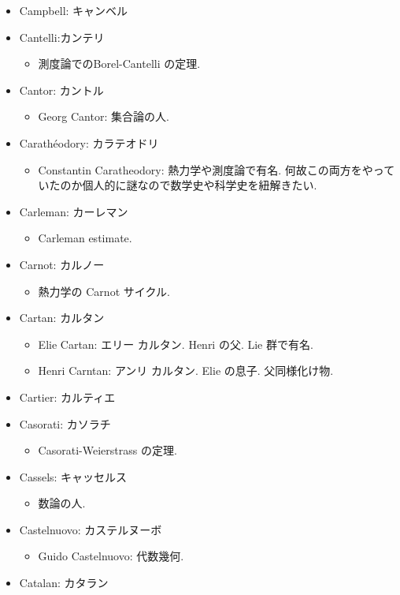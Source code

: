 \documentclass[openany, a4paper, oneside]{jsbook}
\begin{document}
\begin{itemize}
\item Campbell: キャンベル
\item Cantelli:カンテリ
\begin{itemize}
\item 測度論でのBorel-Cantelli の定理.
\end{itemize}
\item Cantor: カントル
\begin{itemize}
\item Georg Cantor: 集合論の人.
\end{itemize}
\item Carath\'eodory: カラテオドリ
\begin{itemize}
\item Constantin Caratheodory: 熱力学や測度論で有名. 何故この両方をやっていたのか個人的に謎なので数学史や科学史を紐解きたい.
\end{itemize}
\item Carleman: カーレマン
\begin{itemize}
\item Carleman estimate.
\end{itemize}
\item Carnot: カルノー
\begin{itemize}
\item 熱力学の Carnot サイクル.
\end{itemize}
\item Cartan: カルタン
\begin{itemize}
\item Elie Cartan: エリー カルタン. Henri の父. Lie 群で有名.
\item Henri Carntan: アンリ カルタン. Elie の息子. 父同様化け物.
\end{itemize}
\item Cartier: カルティエ
\item Casorati: カソラチ
\begin{itemize}
\item Casorati-Weierstrass の定理.
\end{itemize}
\item Cassels: キャッセルス
\begin{itemize}
\item 数論の人.
\end{itemize}
\item Castelnuovo: カステルヌーボ
\begin{itemize}
\item Guido Castelnuovo: 代数幾何.
\end{itemize}
\item Catalan: カタラン

\end{itemize}
\end{document}
